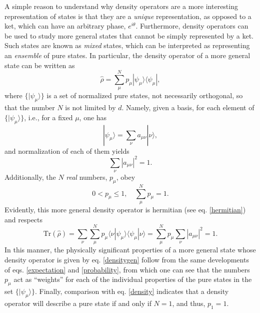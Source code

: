 \documentclass[
12pt,		%
openright,	%
twoside,  %
a4paper,			%
chapter=TITLE,		%
english,			%
french,				%
spanish,			%
brazil				%
]{USPSC-classe/USPSC}
\begin{document}
\begin{apendicesenv}
A simple reason to understand why density operators are a more interesting representation of states is that they are a \textit{unique} representation, as opposed to a ket, which can have an arbitrary phase, $e^{i\theta}$. Furthermore, density operators can be used to study more general states that cannot be simply represented by a ket. Such states are known as \textit{mixed} states, which can be interpreted as representing an \textit{ensemble} of pure states. In particular, the density operator of a more general state can be written as
\begin{equation}\label{densitygen}
    \hat{\rho}=\sum_{\mu}^Np_{\mu}|\psi_{\mu}\rangle\langle\psi_{\mu}|,
\end{equation}
where $\{|\psi_{\mu}\rangle\}$ is a set of normalized pure states, not necessarily orthogonal, so that the number $N$ is not limited by $d$. Namely, given a basis, for each element of $\{|\psi_{\mu}\rangle\}$, i.e., for a fixed $\mu$, one has
\begin{equation}
    |\psi_{\mu}\rangle=\sum_{\nu}a_{\mu\nu}|{\nu}\rangle,
\end{equation}
and normalization of each of them yields
\begin{equation}
    \sum_{\nu}|a_{\mu\nu}|^2=1.
\end{equation}
Additionally, the $N$ \textit{real} numbers, $p_{\mu}$, obey
\begin{equation}\label{mixedrelation}
    0<p_{\mu}\leq1,\quad \sum_{\mu}^Np_{\mu}=1.
\end{equation}
Evidently, this more general density operator is hermitian (see eq. \ref{hermitian}) and respects
\begin{equation}
    \text{Tr}(\hat{\rho})=\sum_{\nu}\sum_{\mu}^Np_{\mu}\langle{\nu}|\psi_{\mu}\rangle\langle\psi_{\mu}|{\nu}\rangle=\sum_{\mu}^Np_{\mu}\sum_{\nu}|a_{\mu\nu}|^2=1.
\end{equation}
In this manner, the physically significant properties of a more general state whose density operator is given by eq. \ref{densitygen} follow from the same developments of eqs. \ref{expectation} and \ref{probability}, from which one can see that the numbers $p_{\mu}$ act as ``weights'' for each of the individual properties of the pure states in the set $\{|\psi_{\mu}\rangle\}$. Finally, comparison with eq. \ref{density} indicates that a  density operator will describe a pure state if and only if $N=1$, and thus, $p_1=1$.


\end{apendicesenv}
\end{document}
